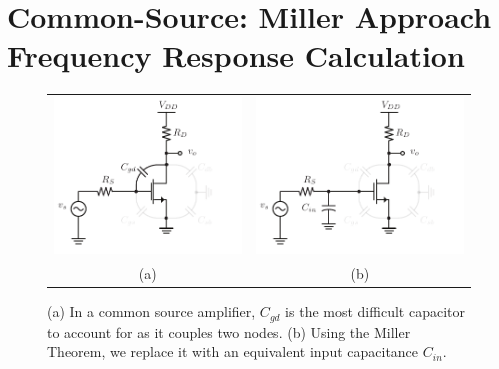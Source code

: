 \section{Common-Source:  Miller Approach Frequency Response Calculation}
\begin{figure}[tb]
\centering
\begin{tabular}{cc}
\includegraphics[scale=0.95]{cs_amp_cgd} &
\includegraphics[scale=0.95]{cs_amp_cgd_miller}\\
(a) & (b)\\
\end{tabular}
\caption{(a) In a common source amplifier, $C_{gd}$ is the most difficult capacitor to account for as it couples two nodes.  (b) Using the Miller Theorem, we replace it with an equivalent input capacitance $C_{in}$.}
\label{fig:cs_amp_cgd}
\end{figure}
